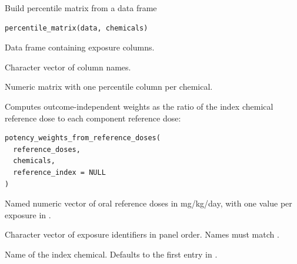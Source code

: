 \documentclass[a4paper]{book}
\begin{document}
%
\begin{Description}
Build percentile matrix from a data frame
\end{Description}
%
\begin{Usage}
\begin{verbatim}
percentile_matrix(data, chemicals)
\end{verbatim}
\end{Usage}
%
\begin{Arguments}
\begin{ldescription}
\item[\code{data}] Data frame containing exposure columns.

\item[\code{chemicals}] Character vector of column names.
\end{ldescription}
\end{Arguments}
%
\begin{Value}
Numeric matrix with one percentile column per chemical.
\end{Value}
%
\begin{Description}
Computes outcome-independent weights as the ratio of the index chemical
reference dose to each component reference dose:
\end{Description}
%
\begin{Usage}
\begin{verbatim}
potency_weights_from_reference_doses(
  reference_doses,
  chemicals,
  reference_index = NULL
)
\end{verbatim}
\end{Usage}
%
\begin{Arguments}
\begin{ldescription}
\item[\code{reference\_doses}] Named numeric vector of oral reference doses in
mg/kg/day, with one value per exposure in .

\item[\code{chemicals}] Character vector of exposure identifiers in panel order.
Names must match .

\item[\code{reference\_index}] Name of the index chemical. Defaults to the first
entry in .
\end{ldescription}
\end{Arguments}
\end{document}
